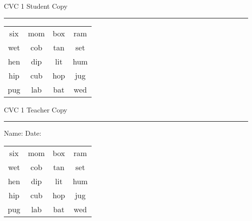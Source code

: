 \documentclass{memoir}
\begin{document}

\footnotesize \noindent
CVC 1 \hfill Student Copy
\smallskip
\hrule

\huge

\setlength{\tabcolsep}{14pt}
\def\arraystretch{2}

{\selectfont


\begin{vplace}[0.5]
\begin{center}
\begin{tabular}{cccc}
six & mom & box & ram \\
wet & cob & tan & set \\
hen & dip & lit & hum \\
hip & cub & hop & jug \\
pug & lab & bat & wed \\
\end{tabular}
\end{center}
\end{vplace}

}

\newpage

\footnotesize \noindent
CVC 1 \hfill Teacher Copy
\smallskip
\hrule

\normalsize

\vfill

\noindent
Name: \underline{\hspace{1.75in}} \hfill Date: \underline{\hspace{1in}}

\huge

{\selectfont


\begin{vplace}[0.5]
\begin{center}
\begin{tabular}{cccc}
six & mom & box & ram \\
wet & cob & tan & set \\
hen & dip & lit & hum \\
hip & cub & hop & jug \\
pug & lab & bat & wed \\
\end{tabular}
\end{center}
\end{vplace}



}
\end{document}
